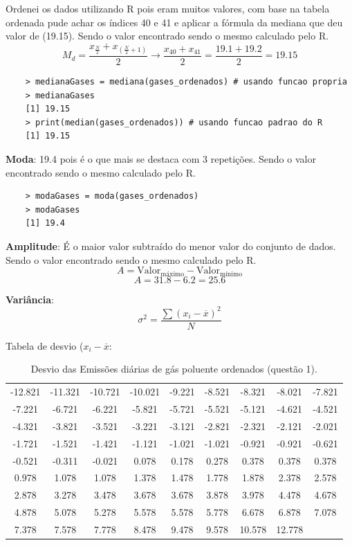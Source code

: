 \documentclass[a4paper,11pt]{article}
\begin{document}
\begin{description}
Ordenei os dados utilizando R pois eram muitos valores, com base na tabela ordenada pude achar os índices 40 e 41 e aplicar a fórmula da mediana que deu valor de (19.15). Sendo o valor encontrado sendo o mesmo calculado pelo R. 
\[M_d = \frac{x_{\frac{N}{2}} + x_{(\frac{N}{2} + 1)}}{2} \xrightarrow{} \frac{x_{40} + x_{41}}{2}  = \frac{19.1 + 19.2}{2} = 19.15\]

\begin{lstlisting}
    > medianaGases = mediana(gases_ordenados) # usando funcao propria
    > medianaGases
    [1] 19.15
    > print(median(gases_ordenados)) # usando funcao padrao do R
    [1] 19.15
    \end{lstlisting}
 
\textbf{Moda}: 19.4 pois é o que mais se destaca com 3 repetições. Sendo o valor encontrado sendo o mesmo calculado pelo R.

\begin{lstlisting}
    > modaGases = moda(gases_ordenados)
    > modaGases
    [1] 19.4
\end{lstlisting}

\textbf{Amplitude}: É o maior valor subtraído do menor valor do conjunto de dados. Sendo o valor encontrado sendo o mesmo calculado pelo R.
\[ A = \text{Valor}_{\text{máximo}} -\text{Valor}_{\text{mínimo}} \]
\[A = 31.8 - 6.2 = 25.6\]

\textbf{Variância}: \[\sigma^2 = \frac{\sum (x_i - \overline{x})^2}{N}\]

Tabela de desvio ($x_i - \overline{x}$:
\begin{table}[H]
    \centering
    \begin{tabular}{ccccccccc}
        \hline
        -12.821 & -11.321 & -10.721 & -10.021 & -9.221 & -8.521 & -8.321 & -8.021 & -7.821 \\ 
        -7.221 & -6.721 & -6.221 & -5.821 & -5.721 & -5.521 & -5.121 & -4.621 & -4.521 \\ 
        -4.321 & -3.821 & -3.521 & -3.221 & -3.121 & -2.821 & -2.321 & -2.121 & -2.021 \\ 
        -1.721 & -1.521 & -1.421 & -1.121 & -1.021 & -1.021 & -0.921 & -0.921 & -0.621 \\ 
        -0.521 & -0.311 & -0.021 & 0.078 & 0.178 & 0.278 & 0.378 & 0.378 & 0.378 \\ 
        0.978 & 1.078 & 1.078 & 1.378 & 1.478 & 1.778 & 1.878 & 2.378 & 2.578 \\ 
        2.878 & 3.278 & 3.478 & 3.678 & 3.678 & 3.878 & 3.978 & 4.478 & 4.678 \\ 
        4.878 & 5.078 & 5.278 & 5.578 & 5.578 & 5.778 & 6.678 & 6.878 & 7.078 \\ 
        7.378 & 7.578 & 7.778 & 8.478 & 9.478 & 9.578 & 10.578 & 12.778 \\ 
        \hline
    \end{tabular}
    \caption{Desvio das Emissões diárias de gás poluente ordenados (questão 1).}
    \label{tab:q1}
\end{table}


\end{description}
\end{document}
